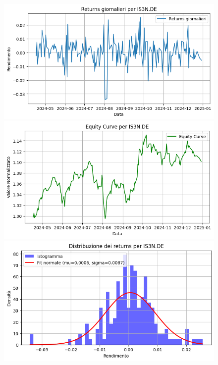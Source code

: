 \documentclass{article}%
\begin{document}
\begin{figure}[htbp]%
\begin{minipage}{0.31\textwidth}%
\includegraphics[width=\linewidth]{immagini_tickers/IS3N.DE_returns_plot.png}%
\end{minipage}%
\begin{minipage}{0.31\textwidth}%
\includegraphics[width=\linewidth]{immagini_tickers/IS3N.DE_equity_curve.png}%
\end{minipage}%
\begin{minipage}{0.31\textwidth}%
\includegraphics[width=\linewidth]{immagini_tickers/IS3N.DE_distribuzione_returns.png}%
\end{minipage}%
\end{figure}
\end{document}
